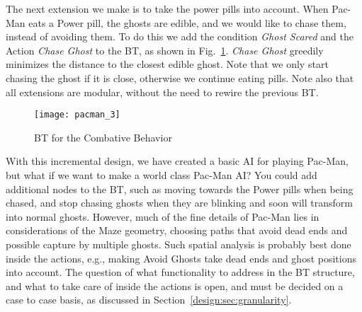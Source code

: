 The next extension we make is to take the power pills into account.
When Pac-Man eats a Power pill, the ghosts are edible, and we would like to chase them, instead of avoiding them.
To do this we add the condition \emph{Ghost  Scared} and the Action \emph{Chase Ghost} to the BT, as shown in Fig.~\ref{bts.fig.eat}.
\emph{Chase Ghost} greedily minimizes the distance to the closest edible ghost.
Note that we only start chasing the ghost if it is close, otherwise we continue eating pills.
Note also that all extensions are modular, without the need to rewire the previous BT.

\begin{figure}[h]
\centering
\texttt{[image: pacman\_3]}
\caption{BT for the Combative Behavior}
\label{bts.fig.eat}
\end{figure}

With this incremental design, we have created a basic AI for playing Pac-Man, but what if we want to make a world class Pac-Man AI?
You could add additional nodes to the BT, such as moving towards the Power pills when being chased, and stop chasing ghosts when they are blinking and soon
will transform into normal ghosts. However, much of the fine details of Pac-Man lies in considerations of the Maze geometry, choosing paths that avoid dead ends and 
possible capture by multiple ghosts.
Such spatial analysis is probably best done inside the actions, e.g., making Avoid Ghosts take dead ends and ghost positions into account.
The question of what functionality to address in the BT structure, and what to take care of inside the actions is open, and must be decided on a case to case basis,
as discussed in Section~\ref{design:sec:granularity}.


